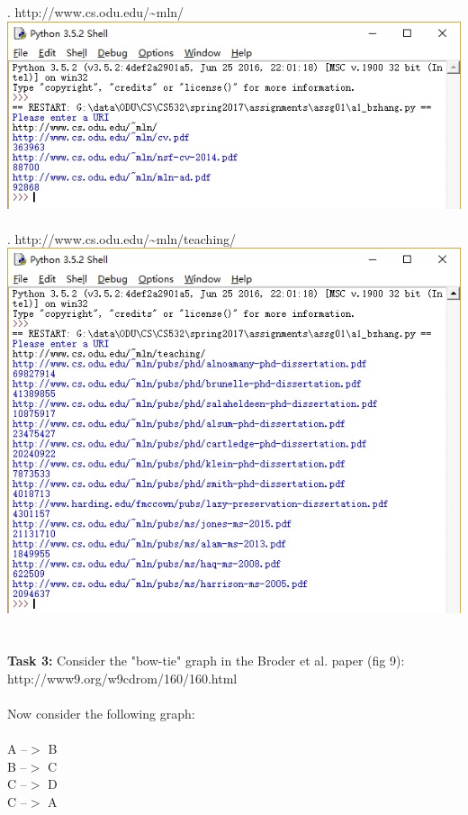 \documentclass{article}
\begin{document}
		. http://www.cs.odu.edu/\~{}mln/\\
		\includegraphics[width=1\textwidth]{result2.jpg}\\\\
		. http://www.cs.odu.edu/\~{}mln/teaching/\\
		\includegraphics[width=1\textwidth]{result3.jpg}\\\\\\
		\textbf{Task 3:} Consider the "bow-tie" graph in the Broder et al. paper (fig 9):\\
		http://www9.org/w9cdrom/160/160.html\\\\
		Now consider the following graph:\\\\
		A --$>$ B\\
		B --$>$ C\\
		C --$>$ D\\
		C --$>$ A\\
\end{document}
